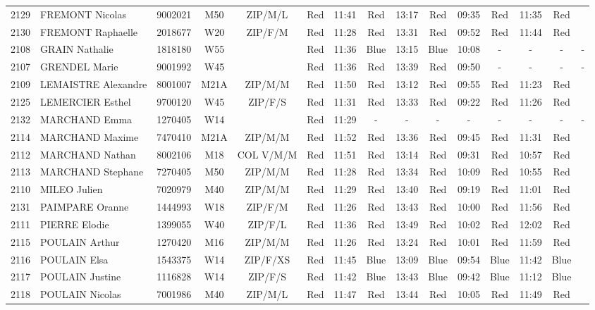 \documentclass{report}
\begin{document}
\begin{longtable}{|c|l|r|c|c|*{5}{cc|}}
    2129 & FREMONT Nicolas & 9002021 & M50 & ZIP/M/L & Red & 11:41 & Red & 13:17 & Red & 09:35 & Red & 11:35 & Red &  \\
    2130 & FREMONT Raphaelle & 2018677 & W20 & ZIP/F/M & Red & 11:28 & Red & 13:31 & Red & 09:52 & Red & 11:44 & Red &  \\
    2108 & GRAIN Nathalie & 1818180 & W55 &   & Red & 11:36 & Blue & 13:15 & Blue & 10:08 & - &  - & - &  -\\
    2107 & GRENDEL Marie & 9001992 & W45 &   & Red & 11:36 & Red & 13:39 & Red & 09:50 & - &  - & - &  -\\
    2109 & LEMAISTRE Alexandre & 8001007 & M21A & ZIP/M/M & Red & 11:50 & Red & 13:12 & Red & 09:55 & Red & 11:23 & Red &  \\
    2125 & LEMERCIER Esthel & 9700120 & W45 & ZIP/F/S & Red & 11:31 & Red & 13:33 & Red & 09:22 & Red & 11:26 & Red &  \\
    2132 & MARCHAND Emma & 1270405 & W14 &   & Red & 11:29 & - &  - & - &  - & - &  - & - &  -\\
    2114 & MARCHAND Maxime & 7470410 & M21A & ZIP/M/M & Red & 11:52 & Red & 13:36 & Red & 09:45 & Red & 11:31 & Red &  \\
    2112 & MARCHAND Nathan & 8002106 & M18 & COL V/M/M & Red & 11:51 & Red & 13:14 & Red & 09:31 & Red & 10:57 & Red &  \\
    2113 & MARCHAND Stephane & 7270405 & M50 & ZIP/M/M & Red & 11:28 & Red & 13:34 & Red & 10:09 & Red & 10:55 & Red &  \\
    2110 & MILEO Julien & 7020979 & M40 & ZIP/M/M & Red & 11:29 & Red & 13:40 & Red & 09:19 & Red & 11:01 & Red &  \\
    2131 & PAIMPARE Oranne & 1444993 & W18 & ZIP/F/M & Red & 11:26 & Red & 13:43 & Red & 10:00 & Red & 11:56 & Red &  \\
    2111 & PIERRE Elodie & 1399055 & W40 & ZIP/F/L & Red & 11:36 & Red & 13:49 & Red & 10:02 & Red & 12:02 & Red &  \\
    2115 & POULAIN Arthur & 1270420 & M16 & ZIP/M/M & Red & 11:26 & Red & 13:24 & Red & 10:01 & Red & 11:59 & Red &  \\
    2116 & POULAIN Elsa & 1543375 & W14 & ZIP/F/XS & Red & 11:45 & Blue & 13:09 & Blue & 09:54 & Blue & 11:42 & Blue &  \\
    2117 & POULAIN Justine & 1116828 & W14 & ZIP/F/S & Red & 11:42 & Blue & 13:43 & Blue & 09:42 & Blue & 11:12 & Blue &  \\
    2118 & POULAIN Nicolas & 7001986 & M40 & ZIP/M/L & Red & 11:47 & Red & 13:44 & Red & 10:05 & Red & 11:49 & Red &  \\

\end{longtable}
\end{document}

